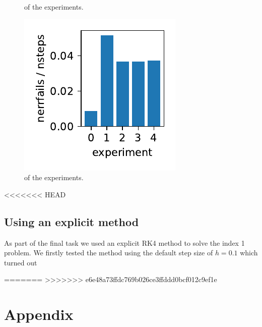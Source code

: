 \documentclass{report}
\begin{document}
\begin{figure}[h]
\begin{minipage}[t]{0.3\textwidth}
\caption{ of the experiments.}
\label{pl:njacs_nsteps_indx1}
\end{minipage}
\hfill
\begin{minipage}[t]{0.3\textwidth}
\centering
\includegraphics[width=\textwidth]{../Plots/Project2_main/Figure_712}
\caption{ of the experiments.}
\label{pl:nerrfails_nsteps_indx1}
\end{minipage}
\end{figure}

<<<<<<< HEAD
\section*{Using an explicit method}

As part of the final task we used an explicit RK4 method to solve the index 1 problem. We firstly tested the method using the default step size of $h=0.1$ which turned out 


=======
>>>>>>> e6e48a73ffdc769b026ce3ffddd0bcf012c9ef1e
\chapter*{Appendix}

\end{document}
